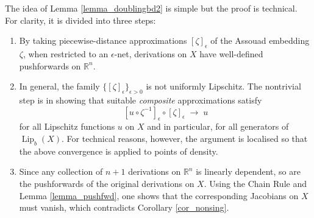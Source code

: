 \documentclass[reqno]{amsart}
\theoremstyle{plain}
\theoremstyle{definition}
\theoremstyle{remark}
\numberwithin{equation}{section}
\newcommand{\e}{\epsilon}
\newcommand{\Lip}{\operatorname{Lip}}
\newcommand{\R}{\mathbb{R}}
\begin{document}
The idea of Lemma \ref{lemma_doublingbd2} is simple but the proof is technical.  For clarity, it is divided into three steps:
\begin{enumerate}
\item By taking piecewise-distance approximations $[\zeta]_\e$ of the Assouad embedding $\zeta$, when restricted to an $\e$-net, derivations on $X$ have well-defined pushforwards on $\R^n$.  

\vspace{.05in}
\item In general, the family $\{[\zeta]_\e\}_{\e > 0}$ is not uniformly Lipschitz.  The nontrivial step is in showing that suitable {\em composite} approximations satisfy 
$$
[u \circ \zeta^{-1}]_\e \circ [\zeta]_\e \;\to\; u
$$
for all Lipschitz functions $u$ on $X$ and in particular, for all generators of $\Lip_b(X)$.
For technical reasons, however, the argument is localised so that the above convergence is applied to points of density.

\vspace{.05in}
\item Since any collection of $n+1$ derivations on $\R^n$ is linearly dependent, so are the pushforwards of the original derivations on $X$.
Using the Chain Rule and Lemma \ref{lemma_pushfwd}, one shows that the corresponding Jacobians on $X$ must vanish, which contradicts Corollary \ref{cor_nonsing}.
\end{enumerate}
\end{document}

